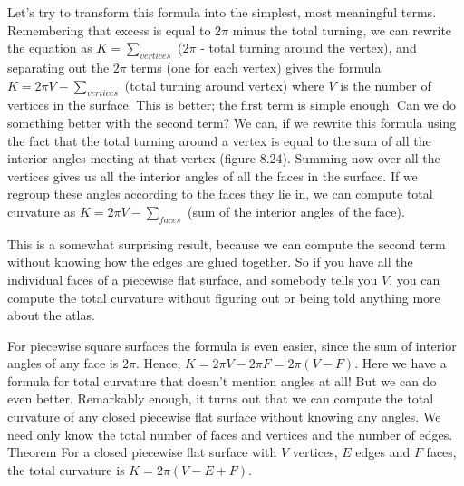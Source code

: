 \documentclass{book}
\begin{document}
Let's try to transform this formula into the simplest, most meaningful
terms. Remembering that excess is equal to $2 \pi$ minus the total turning, we can rewrite the equation as $K = \sum_{vertices}$ ($2 \pi$ - total turning around the vertex), and separating out the $2 \pi$ terms (one for each vertex) gives the formula $K = 2 \pi V - \sum_{vertices}$ (total turning around vertex) where $V$ is the number of vertices in the surface. This is better; the first
term is simple enough. Can we do something better with the second
term? We can, if we rewrite this formula using the fact that the total
turning around a vertex is equal to the sum of all the interior angles
meeting at that vertex (figure 8.24). Summing now over all the vertices
gives us all the interior angles of all the faces in the surface. If we
regroup these angles according to the faces they lie in, we can compute
total curvature as $ K = 2 \pi V - \sum_{faces} $ (sum of the interior angles of the face).

This is a somewhat surprising result, because we can compute the second
term without knowing how the edges are glued together. So if you have
all the individual faces of a piecewise flat surface, and somebody tells
you $V$, you can compute the total curvature without figuring out or
being told anything more about the atlas.

For piecewise square surfaces the formula is even easier, since the sum
of interior angles of any face is $2 \pi$. Hence, $K = 2 \pi V - 2 \pi F = 2 \pi (V - F)$. Here we have a formula for total curvature that doesn't mention
angles at all! But we can do even better. Remarkably enough, it turns
out that we can compute the total curvature of any closed piecewise
flat surface without knowing any angles. We need only know the total
number of faces and vertices and the number of edges.
Theorem For a closed piecewise flat surface with $V$ vertices, $E$ edges
and $F$ faces, the total curvature is $K = 2 \pi (V - E + F)$.
\end{document}
